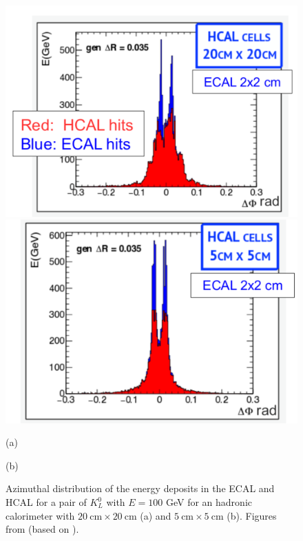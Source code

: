 \begin{figure}
	\centering
	\begin{minipage}{.5\textwidth}
		\centering
		\includegraphics[trim={0 0 0 .4cm},clip,width=\linewidth]{./Figures/hcal_gran_doubleK1.png}
	\end{minipage}%
	\begin{minipage}{.5\textwidth}
		\centering
		\includegraphics[width=\linewidth]{./Figures/hcal_gran_doubleK2.png}
	\end{minipage}
	\begin{minipage}[t]{0.5\textwidth}
		\caption*{(a)}
	\end{minipage}%
	\hfill
	\begin{minipage}[t]{0.5\textwidth}
		\caption*{(b)}
	\end{minipage}
	\caption{Azimuthal distribution of the energy deposits in the ECAL and HCAL for a pair of $K_L^0$ with $E=100$ GeV for an hadronic calorimeter with $20~\text{cm}\times 20~\text{cm}$ (a) and $5~\text{cm}\times 5~\text{cm}$ (b). Figures from \cite{BOOST2017} (based on \cite{FCC_HCALgran_doubleK}).}
	\label{fig:hcal_gran_doubleK}
\end{figure}
